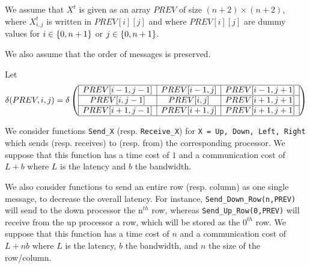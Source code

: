 \begin{question}

We assume that $X^t$ is given as an array $PREV$ of size $(n+2) \times (n+2)$, where $X^t_{i,j}$
is written in $PREV[i][j]$ and where $PREV[i][j]$ are dummy values for $i \in \left\{ 0,n+1 \right\}$ or $j \in \left\{ 0,n+1 \right\}$.

We also assume that the order of messages is preserved.

Let $$\delta(PREV,i,j) = \delta \left( \begin{array}{ | c | c | c |} \hline

  PREV[i-1,j-1] & PREV[i-1,j] & PREV[i-1,j+1] \\ \hline

  PREV[i,j-1] & PREV[i,j] & PREV[i+1,j+1] \\ \hline

  PREV[i+1,j-1] & PREV[i+1,j] & PREV[i+1,j+1] \\ \hline

 \end{array} \right)$$

We consider functions \texttt{Send\_X} (resp. \texttt{Receive\_X}) for \texttt{X = Up, Down, Left, Right} which sends (resp. receives) to (resp. from) the corresponding processor. 
We suppose that this function has a time cost of $1$ and a communication cost of $L+b$ where $L$ is the latency and $b$ the bandwidth.

We also consider functions to send an entire row (resp. column) as one single message, to decrease the overall latency. For instance, \texttt{Send\_Down\_Row(n,PREV)} will send to the down processor the $\text{n}^{th}$ row, whereas \texttt{Send\_Up\_Row(0,PREV)} will receive from the up processor a row, which will be stored as the $\text{0}^{th}$ row.
We suppose that this function has a time cost of $n$ and a communication cost of $L+nb$ where $L$ is the latency, $b$ the bandwidth, and $n$ the size of the row/column.


\end{question}

